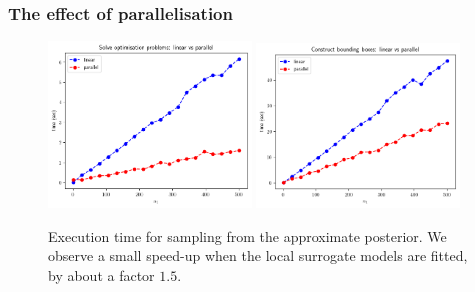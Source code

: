 \subsubsection{The effect of parallelisation}

\begin{figure}[ht]
    \begin{center}
      \includegraphics[width=0.48\textwidth]{./Thesis/images/chapter4/solve_problems_parallel.png}
      \includegraphics[width=0.48\textwidth]{./Thesis/images/chapter4/estimate_regions_parallel.png}
    \end{center}
    \caption[Execution time for sampling from the approximate posterior.]{Execution time for sampling from the approximate
      posterior. We observe a small speed-up when the local surrogate
      models are fitted, by about a factor $1.5$.}
  \label{fig:exec_parallel}
\end{figure}
